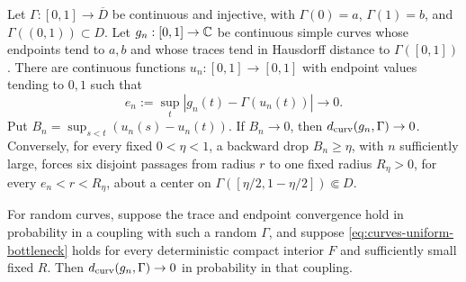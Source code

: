 \begin{lemma}
\label{lem:curve-upgrade}
Let $\Gamma:[0,1]\to\overline D$ be continuous and injective, with
$\Gamma(0)=a$, $\Gamma(1)=b$, and $\Gamma((0,1))\subset D$.  Let
$g_n:[0,1]\to\mathbb C$ be continuous simple curves whose endpoints tend to
$a,b$ and whose traces tend in Hausdorff distance to $\Gamma([0,1])$.
There are continuous functions $u_n:[0,1]\to[0,1]$ with endpoint
values tending to $0,1$ such that
\begin{equation}
 e_n:=\sup_t|g_n(t)-\Gamma(u_n(t))|\longrightarrow0.
 \label{eq:curves-coordinate-error}
\end{equation}
Put $B_n=\sup_{s<t}(u_n(s)-u_n(t))$.  If $B_n\to0$, then
$d_{\rm curv}(g_n,\Gamma)\to0$.  Conversely, for every fixed $0<\eta<1$, a backward
drop $B_n\geq\eta$, with $n$ sufficiently large, forces six disjoint
passages from radius $r$ to one fixed radius $R_\eta>0$, for every
$e_n<r<R_\eta$, about a center on
$\Gamma([\eta/2,1-\eta/2])\Subset D$.

For random curves, suppose the trace and endpoint convergence hold in
probability in a coupling with such a random $\Gamma$, and suppose
\eqref{eq:curves-uniform-bottleneck} holds for every deterministic
compact interior $F$ and sufficiently small fixed $R$.  Then
$d_{\rm curv}(g_n,\Gamma)\to0$ in probability in that coupling.
\end{lemma}

